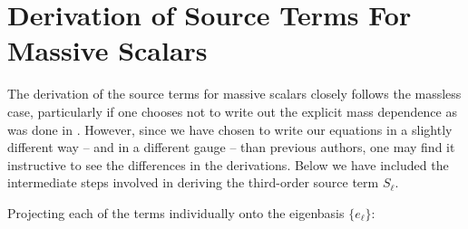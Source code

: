 \documentclass[letterpaper,11pt]{article}
\begin{document}
\appendix
\section{Derivation of Source Terms For Massive Scalars}
\label{source term derivation}
The derivation of the source terms for massive scalars closely follows the massless case, particularly if one chooses not to write out the explicit mass dependence as was done in \cite{1810.04753}. However, since we have chosen to write our equations in a slightly different way -- and in a different gauge -- than previous authors, one may find it instructive to see the differences in the derivations. Below we have included the intermediate steps involved in deriving the third-order source term $S_\ell$.

Projecting each of the terms individually onto the eigenbasis $\{ e_\ell \}$:
\end{document}
